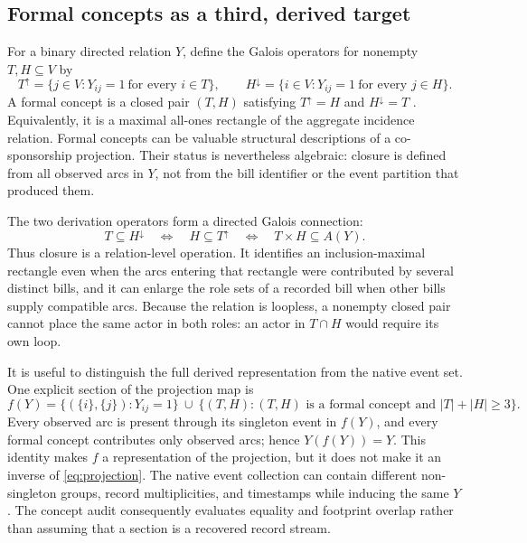 \documentclass{nws}
\begin{document}
\subsection{Formal concepts as a third, derived target}

For a binary directed relation $Y$, define the Galois operators for nonempty $T,H\subseteq V$ by
\begin{equation}
 T^{\uparrow}=\{j\in V:Y_{ij}=1\ \text{for every }i\in T\},
 \qquad
 H^{\downarrow}=\{i\in V:Y_{ij}=1\ \text{for every }j\in H\}.
 \label{eq:galois}
\end{equation}
A formal concept is a closed pair $(T,H)$ satisfying $T^{\uparrow}=H$ and $H^{\downarrow}=T$ \citep{ganterWille1999}. Equivalently, it is a maximal all-ones rectangle of the aggregate incidence relation. Formal concepts can be valuable structural descriptions of a co-sponsorship projection. Their status is nevertheless algebraic: closure is defined from all observed arcs in $Y$, not from the bill identifier or the event partition that produced them.

The two derivation operators form a directed Galois connection:
\begin{equation}
 T\subseteq H^{\downarrow}\quad\Longleftrightarrow\quad
 H\subseteq T^{\uparrow}\quad\Longleftrightarrow\quad T\times H\subseteq A(Y).
 \label{eq:galois-connection}
\end{equation}
Thus closure is a relation-level operation. It identifies an inclusion-maximal rectangle even when the arcs entering that rectangle were contributed by several distinct bills, and it can enlarge the role sets of a recorded bill when other bills supply compatible arcs. Because the relation is loopless, a nonempty closed pair cannot place the same actor in both roles: an actor in $T\cap H$ would require its own loop.

It is useful to distinguish the full derived representation from the native event set. One explicit section of the projection map is
\begin{equation}
 f(Y)=\{(\{i\},\{j\}):Y_{ij}=1\}\ \cup\
 \{(T,H): (T,H)\text{ is a formal concept and }|T|+|H|\geq3\}.
 \label{eq:formal-section}
\end{equation}
Every observed arc is present through its singleton event in $f(Y)$, and every formal concept contributes only observed arcs; hence $Y(f(Y))=Y$. This identity makes $f$ a representation of the projection, but it does not make it an inverse of \eqref{eq:projection}. The native event collection can contain different non-singleton groups, record multiplicities, and timestamps while inducing the same $Y$. The concept audit consequently evaluates equality and footprint overlap rather than assuming that a section is a recovered record stream.
\end{document}
